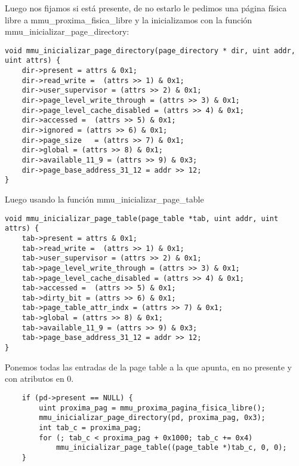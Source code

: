 Luego nos fijamos si está presente, de no estarlo le pedimos una página física libre a mmu\_proxima\_fisica\_libre y la inicializamos con la función mmu\_inicializar\_page\_directory:
\begin{codesnippet}
\begin{verbatim}
void mmu_inicializar_page_directory(page_directory * dir, uint addr, uint attrs) {
    dir->present = attrs & 0x1;
    dir->read_write =  (attrs >> 1) & 0x1;
    dir->user_supervisor = (attrs >> 2) & 0x1;                  
    dir->page_level_write_through = (attrs >> 3) & 0x1;
    dir->page_level_cache_disabled = (attrs >> 4) & 0x1;
    dir->accessed =  (attrs >> 5) & 0x1;
    dir->ignored = (attrs >> 6) & 0x1;
    dir->page_size   = (attrs >> 7) & 0x1;             
    dir->global = (attrs >> 8) & 0x1;
    dir->available_11_9 = (attrs >> 9) & 0x3;
    dir->page_base_address_31_12 = addr >> 12;
}
\end{verbatim}
\end{codesnippet}
\noindent Luego usando la función mmu\_inicializar\_page\_table
\begin{codesnippet}
\begin{verbatim}
void mmu_inicializar_page_table(page_table *tab, uint addr, uint attrs) {
    tab->present = attrs & 0x1;
    tab->read_write =  (attrs >> 1) & 0x1;
    tab->user_supervisor = (attrs >> 2) & 0x1;                  
    tab->page_level_write_through = (attrs >> 3) & 0x1;
    tab->page_level_cache_disabled = (attrs >> 4) & 0x1;
    tab->accessed =  (attrs >> 5) & 0x1;
    tab->dirty_bit = (attrs >> 6) & 0x1;
    tab->page_table_attr_indx = (attrs >> 7) & 0x1;             
    tab->global = (attrs >> 8) & 0x1;
    tab->available_11_9 = (attrs >> 9) & 0x3;
    tab->page_base_address_31_12 = addr >> 12;
}
\end{verbatim}
\end{codesnippet}
 \noindent Ponemos todas las entradas de la page table a la que apunta, en no presente y con atributos en 0.
\begin{codesnippet}
\begin{verbatim}
    if (pd->present == NULL) {
        uint proxima_pag = mmu_proxima_pagina_fisica_libre();
        mmu_inicializar_page_directory(pd, proxima_pag, 0x3);
        int tab_c = proxima_pag;
        for (; tab_c < proxima_pag + 0x1000; tab_c += 0x4)
            mmu_inicializar_page_table((page_table *)tab_c, 0, 0);
    }
\end{verbatim}
\end{codesnippet}

